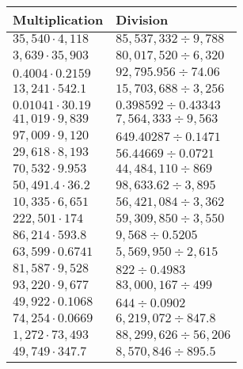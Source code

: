 \begin{longtable}[]{@{}ll@{}}
\toprule
Multiplication & Division\tabularnewline
\midrule
\endhead
\(35,540\cdot4,118\) & \(85,537,332÷9,788\)\tabularnewline
\(3,639\cdot 35,903\) & \(80,017,520÷6,320\)\tabularnewline
\(0.4004\cdot0.2159\) & \(92,795.956÷74.06\)\tabularnewline
\(13,241\cdot542.1\) & \(15,703,688÷3,256\)\tabularnewline
\(0.01041\cdot30.19\) & \(0.398592÷0.43343\)\tabularnewline
\(41,019\cdot9,839\) & \(7,564,333÷9,563\)\tabularnewline
\(97,009\cdot9,120\) & \(649.40287÷0.1471\)\tabularnewline
\(29,618\cdot8,193\) & \(56.44669 ÷0.0721\)\tabularnewline
\(70,532\cdot9.953\) & \(44,484,110÷869\)\tabularnewline
\(50,491.4\cdot36.2\) & \(98,633.62÷3,895\)\tabularnewline
\(10,335\cdot6,651\) & \(56,421,084÷3,362\)\tabularnewline
\(222,501\cdot174\) & \(59,309,850÷3,550\)\tabularnewline
\(86,214\cdot593.8\) & \(9,568÷0.5205\)\tabularnewline
\(63,599\cdot0.6741\) & \(5,569,950÷2,615\)\tabularnewline
\(81,587\cdot9,528\) & \(822÷0.4983\)\tabularnewline
\(93,220\cdot9,677\) & \(83,000,167÷499\)\tabularnewline
\(49,922\cdot0.1068\) & \(644÷0.0902\)\tabularnewline
\(74,254\cdot0.0669\) & \(6,219,072÷847.8\)\tabularnewline
\(1,272\cdot73,493\) & \(88,299,626÷56,206\)\tabularnewline
\(49,749\cdot347.7\) & \(8,570,846÷895.5\)\tabularnewline
\bottomrule
\end{longtable}

